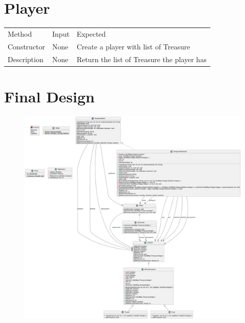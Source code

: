 \documentclass[12pt]{amsart}
\begin{document}

\section{Player}

\begin{table}[htbp]
   \begin{tabular}{@{} lll @{}} %

      Method      & Input & Expected \\
         Constructor        & None    &  Create a player with list of Treasure\\
         Description & None & Return the list of Treasure the player has\\

    \end{tabular}
\end{table}

\section{Final Design}
\begin{figure}[H] %
\centering %
\includegraphics[width=1.2\textwidth]{final_uml.png} %
\end{figure}
\end{document}
